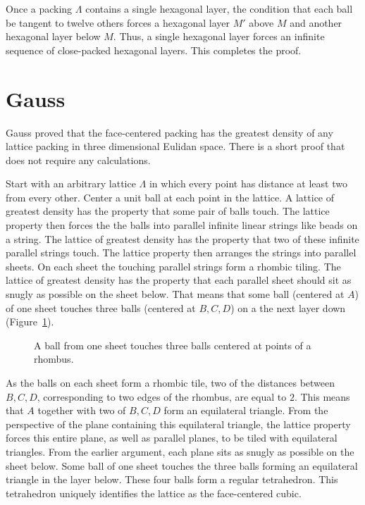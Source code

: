 Once a packing $\Lambda$ contains a single hexagonal layer, the
condition that each ball be tangent to twelve others forces a
hexagonal layer $M'$ above $M$ and another hexagonal layer below
$M$.  Thus, a single hexagonal layer forces an infinite sequence of
close-packed hexagonal layers.  This completes the proof.



\section{Gauss}

Gauss proved that the face-centered packing has the greatest density
of any lattice packing in three dimensional Eulidan space.  
There is a short proof that
does not require any calculations.

Start with an arbitrary lattice $\Lambda$ in which every point has
distance at least two from every other.  Center a unit ball at each
point in the lattice.  A lattice of greatest density has the property that some pair of balls touch.  The lattice property
then forces the the balls into parallel infinite linear strings
like beads on a string.  The lattice of greatest
density has the property that two of these 
infinite parallel strings touch.  The lattice property then arranges the strings into parallel sheets.  On each sheet the touching parallel
strings form a rhombic tiling.  The lattice of greatest density
has the property that each parallel sheet should sit
as snugly as possible on the sheet below.  That means that some ball (centered at $A$) of
one sheet touches three balls (centered at $B,C,D$) 
on a the next layer down (Figure~\ref{fig:rhombus}).

\begin{figure}[htb]
  \centering
  \caption{A ball from one sheet touches three balls centered at points of a rhombus.}
  \label{fig:rhombus}
\end{figure}

As the balls on each sheet form a rhombic tile, two of the distances
between $B,C,D$, corresponding to two edges of the rhombus, 
are equal to $2$.  This means that $A$ together with
two of $B,C,D$ form an equilateral triangle.  From the perspective of the plane
containing this equilateral triangle, the lattice property forces this entire
plane, as well as parallel planes, to be tiled with equilateral triangles.
From the earlier argument, each plane sits as snugly as possible on
the sheet below.  Some ball of one sheet touches the three balls forming
an equilateral triangle in the layer below.  These four balls form a regular
tetrahedron.  This tetrahedron 
uniquely identifies the lattice as the face-centered cubic.






